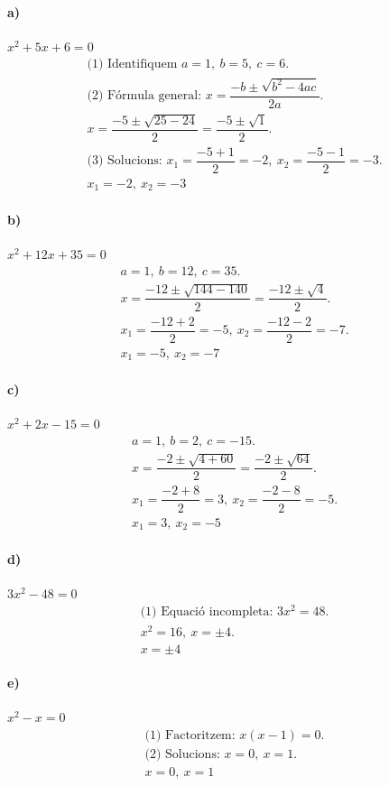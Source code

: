 \documentclass[11pt,a4paper]{article}
\begin{document}
\paragraph{a)} $x^2 + 5x + 6 = 0$
\[
\begin{aligned}
\text{(1) Identifiquem } a=1,\ b=5,\ c=6. \\
\text{(2) Fórmula general: } x=\dfrac{-b\pm\sqrt{b^2-4ac}}{2a}. \\
x=\dfrac{-5\pm\sqrt{25-24}}{2}=\dfrac{-5\pm\sqrt{1}}{2}. \\
\text{(3) Solucions: } x_1=\dfrac{-5+1}{2}=-2,\ x_2=\dfrac{-5-1}{2}=-3. \\
\boxed{x_1=-2,\ x_2=-3}
\end{aligned}
\]

\paragraph{b)} $x^2 + 12x + 35 = 0$
\[
\begin{aligned}
a=1,\ b=12,\ c=35. \\
x=\dfrac{-12\pm\sqrt{144-140}}{2}=\dfrac{-12\pm\sqrt{4}}{2}. \\
x_1=\dfrac{-12+2}{2}=-5,\ x_2=\dfrac{-12-2}{2}=-7. \\
\boxed{x_1=-5,\ x_2=-7}
\end{aligned}
\]

\paragraph{c)} $x^2 + 2x - 15 = 0$
\[
\begin{aligned}
a=1,\ b=2,\ c=-15. \\
x=\dfrac{-2\pm\sqrt{4+60}}{2}=\dfrac{-2\pm\sqrt{64}}{2}. \\
x_1=\dfrac{-2+8}{2}=3,\ x_2=\dfrac{-2-8}{2}=-5. \\
\boxed{x_1=3,\ x_2=-5}
\end{aligned}
\]

\paragraph{d)} $3x^2 - 48 = 0$
\[
\begin{aligned}
\text{(1) Equació incompleta: } 3x^2=48. \\
x^2=16,\ x=\pm4. \\
\boxed{x=\pm4}
\end{aligned}
\]

\paragraph{e)} $x^2 - x = 0$
\[
\begin{aligned}
\text{(1) Factoritzem: } x(x-1)=0. \\
\text{(2) Solucions: } x=0,\ x=1. \\
\boxed{x=0,\ x=1}
\end{aligned}
\]
\end{document}
